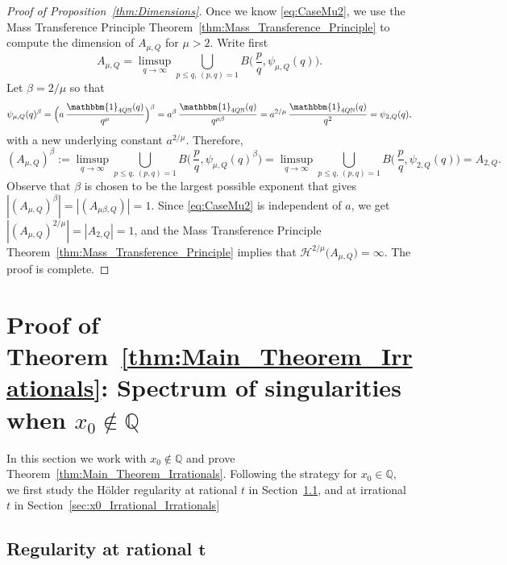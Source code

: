 \documentclass[11pt,reqno]{amsart}
\theoremstyle{definition}
\begin{document}
\begin{proof}[Proof of Proposition~\ref{thm:Dimensions}]
Once we know \eqref{eq:CaseMu2},
 we use the Mass Transference Principle Theorem~\ref{thm:Mass_Transference_Principle}
to compute the dimension of $A_{\mu,Q}$ for $\mu > 2$.
Write first 
\begin{equation}
 A_{\mu,Q} = \limsup_{q \to \infty } \bigcup_{p \leq q, \, (p,q) = 1} B \Big( \, \frac{p}{q}, \psi_{\mu,Q}(q) \Big).
\end{equation}
Let $\beta = 2/\mu$  so that
\begin{equation}
\psi_{\mu,Q}(q)^\beta 
= \Big(a \, \frac{\mathbbm{1}_{4Q\mathbb N}(q)}{q^{\mu}} \Big)^\beta
= a^{\beta} \, \frac{\mathbbm{1}_{4Q\mathbb N}(q)}{q^{\mu \beta}}
= a^{2/\mu} \, \frac{\mathbbm{1}_{4Q\mathbb N}(q)}{q^2}
 = \psi_{2,Q}(q), 
\end{equation}
with a new underlying constant $a^{2/\mu}$.
Therefore, 
\begin{equation}
( A_{\mu,Q})^\beta
:= \limsup_{q \to \infty } \bigcup_{p \leq q, \, (p,q) = 1} B \Big( \,  \frac{p}{q}, \psi_{\mu,Q}(q)^\beta \Big)
= \limsup_{q \to \infty } \bigcup_{p \leq q, \, (p,q) = 1} B \Big( \,  \frac{p}{q}, \psi_{2,Q}(q) \Big)
= A_{2,Q}.
\end{equation}
Observe that $\beta$ is chosen to be the largest possible exponent that gives $ |  ( A_{\mu,Q})^\beta| = | (A_{\mu \beta,Q})| = 1$. 
Since \eqref{eq:CaseMu2} is independent of $a$, we get $ |  (A_{\mu,Q})^{2/\mu} | = | A_{2,Q} | = 1$, 
and the Mass Transference Principle Theorem~\ref{thm:Mass_Transference_Principle} implies that
$ \mathcal H^{2/\mu} \big(  A_{\mu,Q}  \big) =  \infty$. The proof is complete. 
\end{proof}







\section{Proof of Theorem~\ref{thm:Main_Theorem_Irrationals}: Spectrum of singularities when $x_0 \not\in \mathbb Q$}
\label{sec:Irrationals}

In this section we work with $x_0 \not\in \mathbb Q$ 
and prove Theorem~\ref{thm:Main_Theorem_Irrationals}.
Following the strategy for $x_0 \in \mathbb Q$, 
we first study the H\"older regularity at rational $t$ in Section~\ref{sec:x0_Irrational_Rationals}, 
and at irrational $t$ in Section~\ref{sec:x0_Irrational_Irrationals}



\subsection{Regularity at rational $\boldsymbol{t}$}\label{sec:x0_Irrational_Rationals}
\end{document}
